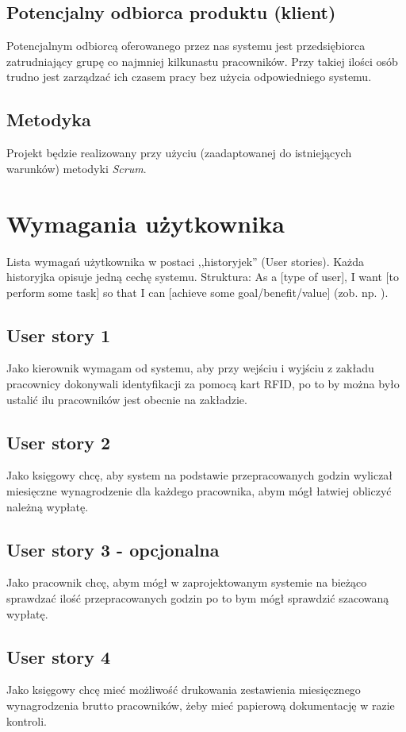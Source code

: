 \documentclass[a4paper]{article}
\begin{document}
\subsection{Potencjalny odbiorca produktu (klient)}

Potencjalnym odbiorcą oferowanego przez nas systemu jest przedsiębiorca zatrudniający grupę co najmniej kilkunastu pracowników. Przy takiej ilości osób trudno jest zarządzać ich czasem pracy bez użycia odpowiedniego systemu.  

\subsection{Metodyka}

Projekt będzie realizowany przy użyciu (zaadaptowanej do istniejących warunków) metodyki {\em Scrum}. 

\section{Wymagania użytkownika}
Lista wymagań użytkownika w postaci ,,historyjek'' (User stories). Każda historyjka opisuje jedną cechę systemu. Struktura: As a [type of user], I want [to perform some task] so that I can [achieve some goal/benefit/value] (zob. np. \cite{us}).

\subsection{User story 1}
Jako kierownik wymagam od systemu, aby przy wejściu i wyjściu z zakładu pracownicy dokonywali identyfikacji za pomocą kart RFID, po to by można było ustalić ilu pracowników jest obecnie na zakładzie.

\subsection{User story 2}
Jako księgowy chcę, aby system na podstawie przepracowanych godzin wyliczał miesięczne wynagrodzenie dla każdego pracownika, abym mógł łatwiej obliczyć należną wypłatę.

\subsection{User story 3 - opcjonalna}
Jako pracownik chcę, abym mógł w zaprojektowanym systemie na bieżąco sprawdzać ilość przepracowanych godzin po to bym mógł sprawdzić szacowaną wypłatę.

\subsection{User story 4}
Jako księgowy chcę mieć możliwość drukowania zestawienia miesięcznego wynagrodzenia brutto pracowników, żeby mieć papierową dokumentację w razie kontroli.
\end{document}
